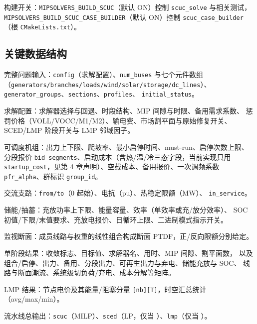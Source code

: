 \documentclass{ctexart}
\begin{document}
构建开关：\texttt{MIPSOLVERS\_BUILD\_SCUC}（默认 ON）控制 \texttt{scuc\_solve}
与相关测试，\texttt{MIPSOLVERS\_BUILD\_SCUC\_CASE\_BUILDER}（默认 ON）控制
\texttt{scuc\_case\_builder}（根 \texttt{CMakeLists.txt}）。

\subsection{关键数据结构}

完整问题输入：\texttt{config}（求解配置）、\texttt{num\_buses} 与七个元件数组
（\texttt{generators/branches/loads/wind/solar/storage/dc\_lines}）、
\texttt{generator\_groups}、\texttt{sections}、\texttt{profiles}、
\texttt{initial\_status}。

求解配置：求解器选择与回退、时段结构、MIP 间隙与时限、备用需求系数、
惩罚价格（VOLL/VOCC/M1/M2）、输电费、市场割平面与原始修复开关、
SCED/LMP 阶段开关与 LMP 邻域因子。

可调度机组：出力上下限、爬坡率、最小启停时间、must-run、启停次数上限、
分段报价 \texttt{bid\_segments}、启动成本（含热/温/冷三态字段，当前实现只用
\texttt{startup\_cost}，见第 4 章声明）、空载成本、备用报价、一次调频系数
\texttt{pfr\_alpha}、群标识 \texttt{group\_id}。

交流支路：\texttt{from/to}（0 起始）、电抗（pu）、热稳定限额（MW）、
\texttt{in\_service}。

储能/抽蓄：充放功率上下限、能量容量、效率（单效率或充/放分效率）、
SOC 初值/下限/末值要求、充放电报价、日循环上限、二进制模式指示开关。

监视断面：成员线路与权重的线性组合构成断面 PTDF，正/反向限额分别给定。

单阶段结果：收敛标志、目标值、求解器名、用时、MIP 间隙、割平面数，
以及组合/启停、出力、备用、分段出力、可再生出力与弃电、储能充放与 SOC、
线路与断面潮流、系统级切负荷/弃电、成本分解等矩阵。

LMP 结果：节点电价及其能量/阻塞分量 \texttt{[nb][T]}，时空汇总统计
（avg/max/min）。

流水线总输出：\texttt{scuc}（MILP）、\texttt{sced}（LP，仅当
）、\texttt{lmp}（仅当 ）。
\end{document}
